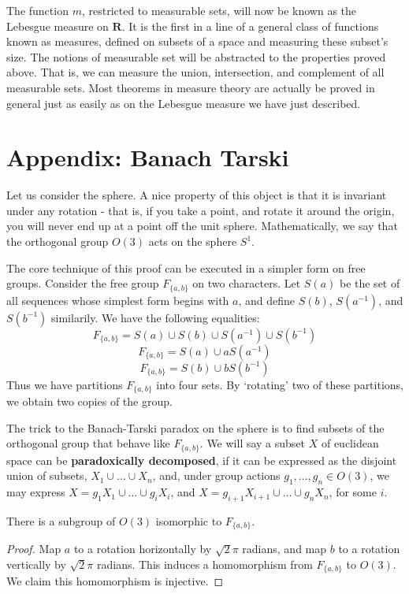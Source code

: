 The function $m$, restricted to measurable sets, will now be known as the Lebesgue measure on $\mathbf{R}$. It is the first in a line of a general class of functions known as measures, defined on subsets of a space and measuring these subset's size. The notions of measurable set will be abstracted to the properties proved above. That is, we can measure the union, intersection, and complement of all measurable sets. Most theorems in measure theory are actually be proved in general just as easily as on the Lebesgue measure we have just described.





\section{Appendix: Banach Tarski}

Let us consider the sphere. A nice property of this object is that it is invariant under any rotation - that is, if you take a point, and rotate it around the origin, you will never end up at a point off the unit sphere. Mathematically, we say that the orthogonal group $O(3)$ acts on the sphere $S^1$.

The core technique of this proof can be executed in a simpler form on free groups. Consider the free group $F_{\{a,b\}}$ on two characters. Let $S(a)$ be the set of all sequences whose simplest form begins with $a$, and define $S(b)$, $S(a^{-1})$, and $S(b^{-1})$ similarily. We have the following equalities:
%
\[ F_{\{a,b\}} = S(a) \cup S(b) \cup S(a^{-1}) \cup S(b^{-1}) \]
\[ F_{\{a,b\}} = S(a) \cup aS(a^{-1}) \]
\[ F_{\{a,b\}} = S(b) \cup bS(b^{-1}) \]
%
Thus we have partitions $F_{\{a,b\}}$ into four sets. By `rotating' two of these partitions, we obtain two copies of the group.

The trick to the Banach-Tarski paradox on the sphere is to find subsets of the orthogonal group that behave like $F_{\{a,b\}}$. We will say a subset $X$ of euclidean space can be {\bf paradoxically decomposed}, if it can be expressed as the disjoint union of subsets, $X_1 \cup \dots \cup X_n$, and, under group actions $g_1, \dots, g_n \in O(3)$, we may express $X = g_1X_1 \cup \dots \cup g_iX_i$, and $X = g_{i+1}X_{i+1} \cup \dots \cup g_nX_n$, for some $i$.

\begin{lemma}
    There is a subgroup of $O(3)$ isomorphic to $F_{\{a,b\}}$.
\end{lemma}
\begin{proof}
    Map $a$ to a rotation horizontally by $\sqrt{2}\pi$ radians, and map $b$ to a rotation vertically by $\sqrt{2}\pi$ radians. This induces a homomorphism from $F_{\{a,b\}}$ to $O(3)$. We claim this homomorphism is injective.
\end{proof}

